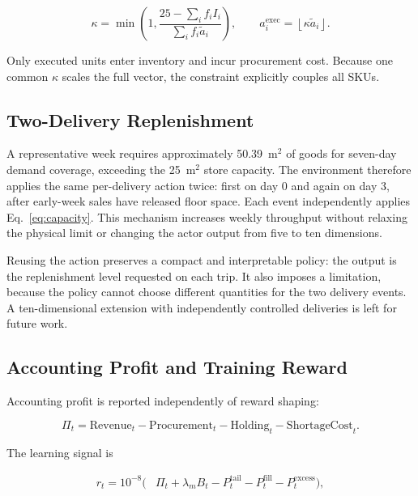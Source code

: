 \documentclass[pdflatex,sn-mathphys-num]{sn-jnl}
\begin{document}
\begin{equation}
\kappa = \min\left(1,
\frac{25-\sum_i f_i I_i}{\sum_i f_i\widetilde{a}_i}
\right),
\qquad
a_i^{\mathrm{exec}}=\left\lfloor\kappa\widetilde{a}_i\right\rfloor.
\label{eq:capacity}
\end{equation}

Only executed units enter inventory and incur procurement cost. Because one common $\kappa$ scales the full vector, the constraint explicitly couples all SKUs.

\subsection{Two-Delivery Replenishment}\label{subsec:two-delivery}

A representative week requires approximately 50.39~m$^2$ of goods for seven-day demand coverage, exceeding the 25~m$^2$ store capacity. The environment therefore applies the same per-delivery action twice: first on day 0 and again on day 3, after early-week sales have released floor space. Each event independently applies Eq.~\eqref{eq:capacity}. This mechanism increases weekly throughput without relaxing the physical limit or changing the actor output from five to ten dimensions.

Reusing the action preserves a compact and interpretable policy: the output is the replenishment level requested on each trip. It also imposes a limitation, because the policy cannot choose different quantities for the two delivery events. A ten-dimensional extension with independently controlled deliveries is left for future work.

\subsection{Accounting Profit and Training Reward}\label{subsec:reward}

Accounting profit is reported independently of reward shaping:

\begin{equation}
\Pi_t = \mathrm{Revenue}_t-\mathrm{Procurement}_t-
\mathrm{Holding}_t-\mathrm{ShortageCost}_t.
\label{eq:profit}
\end{equation}

The learning signal is

\begin{align}
r_t = 10^{-8}\big(&\Pi_t + \lambda_m B_t
-P_t^{\mathrm{tail}}-P_t^{\mathrm{fill}}
-P_t^{\mathrm{excess}}\big),
\label{eq:reward}
\end{align}
\end{document}
